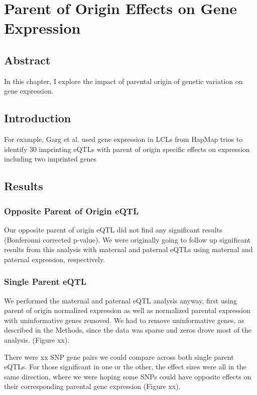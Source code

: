 
\chapter{Parent of Origin Effects on Gene Expression }\label{ch:poeqtl}
\section[Abstract]{Abstract}

In this chapter, I explore the impact of parental origin of genetic variation on gene expression. 


\section{Introduction}\label{ch04-introduction}

For example, Garg et al. used gene expression in LCLs from HapMap trios to identify 30 imprinting eQTLs with parent of origin specific effects on expression including two imprinted genes\cite{Garg2012a}

\section{Results}\label{ch04-results}
\subsection{Opposite Parent of Origin eQTL}\label{Opposite Parent of Origin eQTL} 
Our opposite parent of origin eQTL did not find any significant results (Bonferonni corrected p-value). We were originally going to follow up significant results from this analysis with maternal and paternal eQTLs using maternal and paternal expression, respectively. 

\subsection{Single Parent eQTL}\label{Single Parent eQTL} 
We performed the maternal and paternal eQTL analysis anyway, first using parent of origin normalized expression as well as normalized parental expression with uninformative genes removed. We had to remove uninformative genes, as described in the Methods, since the data was sparse and zeros drove most of the analysis.  (Figure xx). 

There were xx SNP gene pairs we could compare across both single parent eQTLs. For those significant in one or the other, the effect sizes were all in the same direction, where we were hoping some SNPs could have opposite effects on their corresponding parental gene expression (Figure xx).

